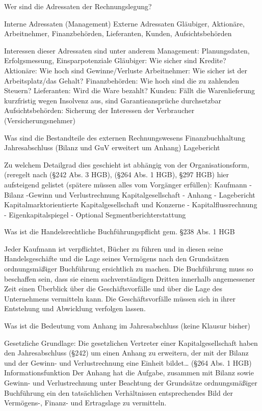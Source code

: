 Wer sind die Adressaten der Rechnungslegung?

Interne Adressaten (Management)
Externe Adressaten 
Gläubiger, Aktionäre, Arbeitnehmer, Finanzbehörden, Lieferanten, Kunden, Aufsichtsbehörden

Interessen dieser Adressaten sind unter anderem
Management: Planungsdaten, Erfolgsmessung, Einsparpotenziale 
Gläubiger: Wie sicher sind Kredite?
Aktionäre: Wie hoch sind Gewinne/Verluste
Arbeitnehmer: Wie sicher ist der Arbeitsplatz/das Gehalt?
Finanzbehörden: Wie hoch sind die zu zahlenden Steuern?
Lieferanten: Wird die Ware bezahlt?
Kunden: Fällt die Warenlieferung kurzfristig wegen Insolvenz aus, sind Garantieansprüche
durchsetzbar
Aufsichtsbehörden: Sicherung der Interessen der Verbraucher (Versicherungsnehmer)



Was sind die Bestandteile des externen Rechnungswesens
Finanzbuchhaltung
Jahresabschluss (Bilanz und GuV erweitert um Anhang)
Lagebericht

Zu welchem Detailgrad dies geschieht ist abhängig von der Organisationsform, 
(reregelt nach (§242 Abs. 3 HGB), (§264 Abs. 1 HGB), §297 HGB) hier aufsteigend gelistet
(spätere müssen alles vom Vorgänger erfüllen):
Kaufmann
-Bilanz
-Gewinn und Verlustrechnung
Kapitalgesellschaft
- Anhang
- Lagebericht
Kapitalmarktorientierte Kapitalgesellschaft und Konzerne
- Kapitalflussrechnung
- Eigenkapitalspiegel
- Optional Segmentberichterstattung

Was ist die Handelsrechtliche Buchführungspflicht gem. §238 Abs. 1 HGB

Jeder Kaufmann ist verpflichtet, Bücher zu führen und
in diesen seine Handelsgeschäfte und die Lage seines
Vermögens nach den Grundsätzen ordnungsmäßiger
Buchführung ersichtlich zu machen.
Die Buchführung muss so beschaffen sein, dass sie
einem sachverständigen Dritten innerhalb
angemessener Zeit einen Überblick über die Geschäftsvorfälle und über die Lage des Unternehmens
vermitteln kann.
Die Geschäftsvorfälle müssen sich in ihrer Entstehung
und Abwicklung verfolgen lassen.



Was ist die Bedeutung vom Anhang im Jahresabschluss (keine Klausur bisher)

Gesetzliche Grundlage:
Die gesetzlichen Vertreter einer Kapitalgesellschaft haben den Jahresabschluss (§242) um einen Anhang zu erweitern, der mit der Bilanz und der Gewinn- und Verlustrechnung eine Einheit bildet… (§264 Abs. 1 HGB)
Informationsfunktion 
Der Anhang hat die Aufgabe, zusammen mit Bilanz sowie Gewinn- und Verlustrechnung unter Beachtung der Grundsätze ordnungsmäßiger Buchführung ein den
tatsächlichen Verhältnissen entsprechendes Bild der Vermögens-, Finanz- und Ertragslage zu vermitteln.

